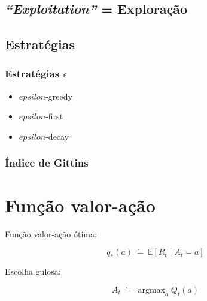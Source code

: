 \documentclass{article}
\DeclareMathOperator*{\argmax}{argmax}
\begin{document}
        \subsection{\textit{``Exploitation''} = Exploração}
    
    \subsection{Estratégias}
    
        \subsubsection{Estratégias $\epsilon$}
        
            \begin{itemize}
                \item $epsilon$-greedy
                \item $epsilon$-first
                \item $epsilon$-decay
            \end{itemize}
        
        \subsubsection{Índice de Gittins}

\section{Função valor-ação}

    Função valor-ação ótima:

    \begin{equation}
        q_*(a) \ \dot{=} \ \mathbb{E}[R_t \mid A_t = a]
    \end{equation}

    Escolha gulosa:

    \begin{equation}
        A_t \ \dot{=} \ \argmax_a Q_t(a)
    \end{equation}
    
\end{document}
